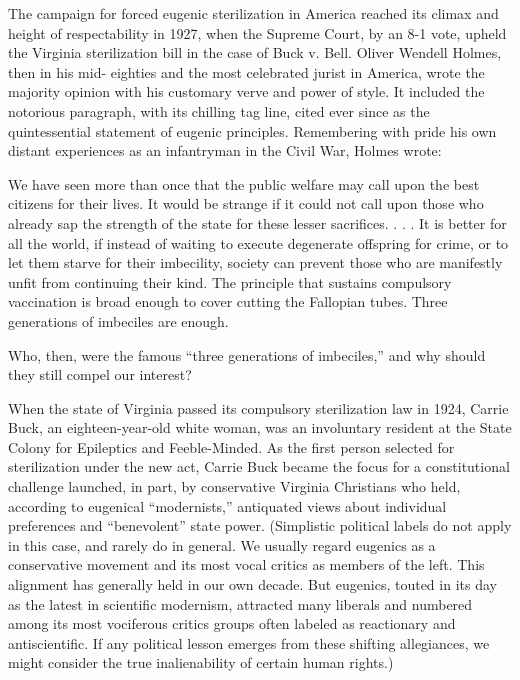 \documentclass[12pt]{letter}
\begin{document}
The campaign for forced eugenic sterilization in America reached its climax and height
of respectability in 1927, when the Supreme Court, by an 8-1 vote, upheld the Virginia
sterilization bill in the case of Buck v. Bell. Oliver Wendell Holmes, then in his mid-
eighties and the most celebrated jurist in America, wrote the majority opinion with his
customary verve and power of style. It included the notorious paragraph, with its chilling
tag line, cited ever since as the quintessential statement of eugenic principles.
Remembering with pride his own distant experiences as an infantryman in the Civil War,
Holmes wrote:

We have seen more than once that the public welfare may call upon the best
citizens for their lives. It would be strange if it could not call upon those who
already sap the strength of the state for these lesser sacrifices. . . . It is better
for all the world, if instead of waiting to execute degenerate offspring for
crime, or to let them starve for their imbecility, society can prevent those who
are manifestly unfit from continuing their kind. The principle that sustains
compulsory vaccination is broad enough to cover cutting the Fallopian tubes.
Three generations of imbeciles are enough.

Who, then, were the famous “three generations of imbeciles,” and why should they still
compel our interest?

When the state of Virginia passed its compulsory sterilization law in 1924, Carrie Buck,
an eighteen-year-old white woman, was an involuntary resident at the State Colony for
Epileptics and Feeble-Minded. As the first person selected for sterilization under the new
act, Carrie Buck became the focus for a constitutional challenge launched, in part, by
conservative Virginia Christians who held, according to eugenical “modernists,”
antiquated views about individual preferences and “benevolent” state power. (Simplistic
political labels do not apply in this case, and rarely do in general. We usually regard
eugenics as a conservative movement and its most vocal critics as members of the left.
This alignment has generally held in our own decade. But eugenics, touted in its day as
the latest in scientific modernism, attracted many liberals and numbered among its most
vociferous critics groups often labeled as reactionary and antiscientific. If any political
lesson emerges from these shifting allegiances, we might consider the true inalienability of certain human rights.)
\end{document}
